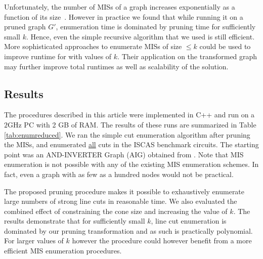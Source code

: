 \documentclass[journal]{IEEEtran}
\begin{document}
Unfortunately, the number of MISs of a graph increases exponentially as a function of its size~\cite{moon1965cliques}. However in practice  we found that while running it on a pruned graph $G'$, enumeration time is dominated by pruning time for sufficiently small $k$.  Hence, even the simple recursive algorithm that we used is still efficient. More sophisticated approaches to enumerate MISs of size $\leq k$ \cite{byskov2003algorithms,eppstein2001small} could be used to improve runtime for with values of $k$. Their application on the transformed graph may further improve total runtimes as well as scalability of the solution.

\subsection{Results}

The procedures described in this article were implemented in C++ and run on a $2$GHz PC with 2 GB of RAM.  The results of these runs are summarized in Table \ref{tab:enumreduced}. We ran the simple cut enumeration algorithm after pruning the MISs, and enumerated \underline{all} cuts in the  ISCAS benchmark circuits. The starting point was an AND-INVERTER Graph (AIG) obtained from \cite{Mishchenko2007}. Note that MIS enumeration is not possible with any of the existing MIS enumeration schemes.  In fact, even a graph with as few as a hundred nodes would not be practical.  

The proposed pruning procedure makes it possible to exhaustively enumerate large numbers of strong line cuts in reasonable time. We also evaluated the combined effect of constraining the cone size and increasing the value of $k$.  The results demonstrate that for sufficiently small $k$, line cut enumeration is dominated by our pruning transformation and as such is practically polynomial. For larger values of $k$ however the procedure could however benefit from a more efficient MIS enumeration procedures. 
\end{document}
